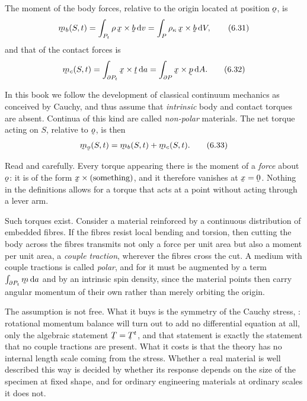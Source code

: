 The moment of the body forces, relative to the origin located at
position $\bo$, is
\begin{equation}
   \bm_{b}(S,t)=\int_{P_{t}}\rho\,\bx\times\bb\,\dl v
   =\int_{P}\rho_{\kappa}\,\bx\times\bb\,\dl V ,
   \tag{6.31}\label{eq:6.31}
\end{equation}
and that of the contact forces is
\begin{equation}
   \bm_{c}(S,t)=\int_{\partial P_{t}}\bx\times\bt\,\dl a
   =\int_{\partial P}\bx\times\bp\,\dl A .
   \tag{6.32}\label{eq:6.32}
\end{equation}

In this book we follow the development of classical continuum mechanics
as conceived by Cauchy, and thus assume that \emph{intrinsic} body and
contact torques are absent. Continua of this kind are called
\emph{non-polar} materials. The net torque acting on $S$, relative to
$\bo$, is then
\begin{equation}
   \bm_{\bo}(S,t)=\bm_{b}(S,t)+\bm_{c}(S,t).
   \tag{6.33}\label{eq:6.33}
\end{equation}

\begin{remark}\label{rem:ch6nonpolar}
Read  and  carefully. Every torque appearing there
is the moment of a \emph{force} about $\bo$: it is of the form
$\bx\times(\text{something})$, and it therefore vanishes at
$\bx=\bze$. Nothing in the definitions allows for a torque that acts at
a point without acting through a lever arm.

Such torques exist. Consider a material reinforced by a continuous
distribution of embedded fibres. If the fibres resist local bending and
torsion, then cutting the body across the fibres transmits not only a
force per unit area but also a moment per unit area, a \emph{couple
traction}, wherever the fibres cross the cut. A medium with couple
tractions is called \emph{polar}, and for it  must be
augmented by a term $\int_{\partial P_{t}}\bmm\,\dl a$ and 
by an intrinsic spin density, since the material points then carry
angular momentum of their own rather than merely orbiting the origin.

The assumption is not free. What it buys is the symmetry of the Cauchy
stress,
: rotational momentum balance will turn out to add no
differential equation at all, only the algebraic statement
$\bT=\bT^{t}$, and that statement is exactly the statement that no
couple tractions are present. What it costs is that the theory has no
internal length scale coming from the stress. Whether a real material
is well described this way is decided by whether its response depends
on the size of the specimen at fixed shape, and for ordinary
engineering materials at ordinary scales it does not.
\end{remark}

